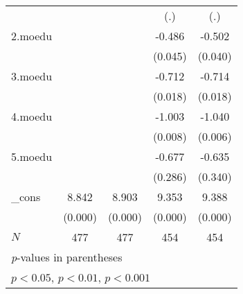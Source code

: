 {\begin{tabular}{l*{4}{c}}
            &                     &                     &         (.)         &         (.)         \\
[1em]
2.moedu     &                     &                     &      -0.486\sym{*}  &      -0.502\sym{*}  \\
            &                     &                     &     (0.045)         &     (0.040)         \\
[1em]
3.moedu     &                     &                     &      -0.712\sym{*}  &      -0.714\sym{*}  \\
            &                     &                     &     (0.018)         &     (0.018)         \\
[1em]
4.moedu     &                     &                     &      -1.003\sym{**} &      -1.040\sym{**} \\
            &                     &                     &     (0.008)         &     (0.006)         \\
[1em]
5.moedu     &                     &                     &      -0.677         &      -0.635         \\
            &                     &                     &     (0.286)         &     (0.340)         \\
[1em]
\_cons      &       8.842\sym{***}&       8.903\sym{***}&       9.353\sym{***}&       9.388\sym{***}\\
            &     (0.000)         &     (0.000)         &     (0.000)         &     (0.000)         \\
\hline
\(N\)       &         477         &         477         &         454         &         454         \\
\hline\hline
\multicolumn{5}{l}{\footnotesize \textit{p}-values in parentheses}\\
\multicolumn{5}{l}{\footnotesize \sym{*} \(p<0.05\), \sym{**} \(p<0.01\), \sym{***} \(p<0.001\)}\\
\end{tabular}
}
